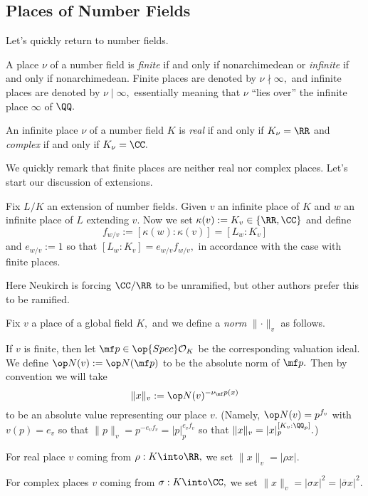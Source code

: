 \documentclass[../notes.tex]{subfiles}
\begin{document}
\subsection{Places of Number Fields}
Let's quickly return to number fields.
\begin{definition}
	A place $\nu$ of a number field is \textit{finite} if and only if nonarchimedean or \textit{infinite} if and only if nonarchimedean. Finite places are denoted by $\nu\nmid\infty,$ and infinite places are denoted by $\nu\mid\infty,$ essentially meaning that $\nu$ ``lies over'' the infinite place $\infty$ of $\QQ.$
\end{definition}
\begin{definition}
	An infinite place $\nu$ of a number field $K$ is \textit{real} if and only if $K_\nu=\RR$ and \textit{complex} if and only if $K_\nu=\CC.$
\end{definition}
We quickly remark that finite places are neither real nor complex places. Let's start our discussion of extensions.
\begin{definition}
	Fix $L/K$ an extension of number fields. Given $v$ an infinite place of $K$ and $w$ an infinite place of $L$ extending $v.$ Now we set $\kappa(v):=K_v\in\{\RR,\CC\}$ and define
	\[f_{w/v}:=[\kappa(w):\kappa(v)]=[L_w:K_v]\]
	and $e_{w/v}:=1$ so that $[L_w:K_v]=e_{w/v}f_{w/v},$ in accordance with the case with finite places.
\end{definition}
\begin{warn}
	Here Neukirch is forcing $\CC/\RR$ to be unramified, but other authors prefer this to be ramified.
\end{warn}
\begin{definition}
	Fix $v$ a place of a global field $K,$ and we define a \textit{norm} $\lVert\cdot\rVert_v$ as follows.
	\begin{listalph}
		\item If $v$ is finite, then let $\mf p\in\op{Spec}\mathcal O_K$ be the corresponding valuation ideal. We define $\op N(v):=\op N(\mf p)$ to be the absolute norm of $\mf p.$ Then by convention we will take
		\[\lVert x\rVert_v:=\op N(v)^{-\nu_\mf p(x)}\]
		to be an absolute value representing our place $v.$ (Namely, $\op N(v)=p^{f_v}$ with $v(p)=e_v$ so that $\lVert p\rVert_v=p^{-e_vf_v}=|p|_p^{e_vf_v}$ so that $\lVert x\rVert_v=|x|_p^{[K_v:\QQ_p]}.$)
		\item For real place $v$ coming from $\rho:K\into\RR,$ we set $\lVert x\rVert_v=|\rho x|.$
		\item For complex places $v$ coming from $\sigma:K\into\CC,$ we set $\lVert x\rVert_v=|\sigma x|^2=|\overline\sigma x|^2.$
	\end{listalph}
\end{definition}
\end{document}
